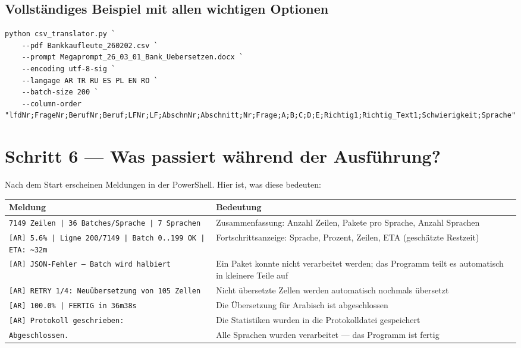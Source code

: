 \documentclass[a4paper,11pt]{article}
\begin{document}
\subsection{Vollständiges Beispiel mit allen wichtigen Optionen}

\begin{lstlisting}
python csv_translator.py `
    --pdf Bankkaufleute_260202.csv `
    --prompt Megaprompt_26_03_01_Bank_Uebersetzen.docx `
    --encoding utf-8-sig `
    --langage AR TR RU ES PL EN RO `
    --batch-size 200 `
    --column-order "lfdNr;FrageNr;BerufNr;Beruf;LFNr;LF;AbschnNr;Abschnitt;Nr;Frage;A;B;C;D;E;Richtig1;Richtig_Text1;Schwierigkeit;Sprache"
\end{lstlisting}

\section{Schritt 6 — Was passiert während der Ausführung?}

Nach dem Start erscheinen Meldungen in der PowerShell. Hier ist, was diese bedeuten:

\begin{center}
\begin{tabularx}{0.96\textwidth}{@{}l X@{}}
\toprule
\textbf{Meldung} & \textbf{Bedeutung} \\
\midrule
\texttt{7149 Zeilen | 36 Batches/Sprache | 7 Sprachen} &
  Zusammenfassung: Anzahl Zeilen, Pakete pro Sprache, Anzahl Sprachen \\[4pt]
\texttt{[AR] 5.6\% | Ligne 200/7149 | Batch 0..199 OK | ETA: \textasciitilde32m} &
  Fortschrittsanzeige: Sprache, Prozent, Zeilen, ETA (geschätzte Restzeit) \\[4pt]
\texttt{[AR] JSON-Fehler — Batch wird halbiert} &
  Ein Paket konnte nicht verarbeitet werden; das Programm teilt es automatisch
  in kleinere Teile auf \\[4pt]
\texttt{[AR] RETRY 1/4: Neuübersetzung von 105 Zellen} &
  Nicht übersetzte Zellen werden automatisch nochmals übersetzt \\[4pt]
\texttt{[AR] 100.0\% | FERTIG in 36m38s} &
  Die Übersetzung für Arabisch ist abgeschlossen \\[4pt]
\texttt{[AR] Protokoll geschrieben:} &
  Die Statistiken wurden in die Protokolldatei gespeichert \\[4pt]
\texttt{Abgeschlossen.} &
  Alle Sprachen wurden verarbeitet — das Programm ist fertig \\
\bottomrule
\end{tabularx}
\end{center}
\end{document}
